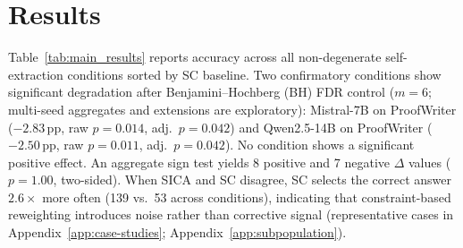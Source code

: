 \section{Results}
\label{sec:results}
\label{sec:main-results}

 Table~\ref{tab:main_results} reports accuracy across all non-degenerate self-extraction conditions sorted by SC baseline. Two confirmatory conditions show significant degradation after Benjamini--Hochberg (BH) FDR control ($m{=}6$; multi-seed aggregates and extensions are exploratory): Mistral-7B on ProofWriter ($-2.83$\,pp, raw $p = 0.014$, adj.\ $p = 0.042$) and Qwen2.5-14B on ProofWriter ($-2.50$\,pp, raw $p = 0.011$, adj.\ $p = 0.042$). No condition shows a significant positive effect. An aggregate sign test yields 8 positive and 7 negative $\Delta$ values ($p = 1.00$, two-sided). When SICA and SC disagree, SC selects the correct answer $2.6\times$ more often (139 vs.\ 53 across conditions), indicating that constraint-based reweighting introduces noise rather than corrective signal (representative cases in Appendix~\ref{app:case-studies}; Appendix~\ref{app:subpopulation}).

